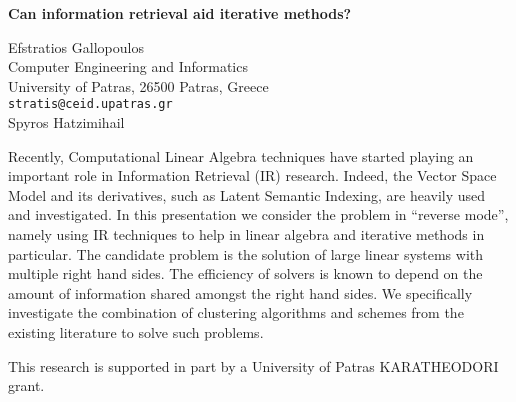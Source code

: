 \documentclass{report}
\begin{document}

\begin{center}
{\large
{\bf Can information retrieval aid iterative methods?}}

	Efstratios Gallopoulos \\
	Computer Engineering and Informatics \\
	University of Patras, 26500 Patras, Greece \\
	{\tt stratis@ceid.upatras.gr} \\
	Spyros Hatzimihail
\end{center}
Recently, Computational Linear Algebra techniques have
started playing an important role in Information Retrieval
(IR) research. Indeed, the Vector Space Model and its
derivatives, such as Latent Semantic Indexing, are heavily
used and investigated. In this presentation we consider the
problem in ``reverse mode'', namely using IR techniques to
help in linear algebra and iterative methods in particular.
The candidate problem is the solution of large linear
systems with multiple right hand sides. The efficiency of
solvers is known to depend on the amount of information
shared amongst the right hand sides. We specifically
investigate the combination of clustering algorithms and
schemes from the existing literature to solve such problems.

This research is supported in part by a University of
Patras KARATHEODORI grant.



\end{document}
